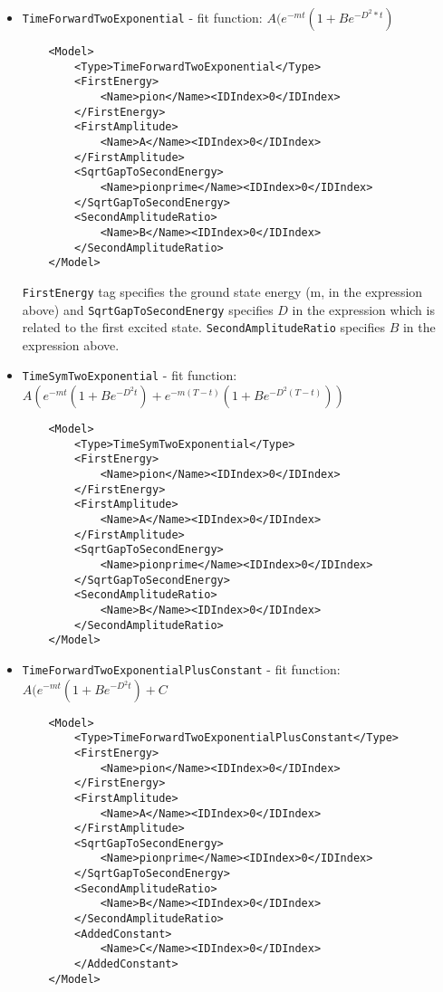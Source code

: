 \documentclass[12pt,notitlepage,letterpaper]{article}
\newcommand{\vb}{\texttt}
\begin{document}
\begin{itemize}
\item \vb{TimeForwardTwoExponential} - fit function: $A(e^{-mt}(1 + B e^{-D^2*t})$ 
\begin{verbatim}
    <Model>
        <Type>TimeForwardTwoExponential</Type>
        <FirstEnergy>
            <Name>pion</Name><IDIndex>0</IDIndex>
        </FirstEnergy>
        <FirstAmplitude>
            <Name>A</Name><IDIndex>0</IDIndex>
        </FirstAmplitude>
        <SqrtGapToSecondEnergy>
            <Name>pionprime</Name><IDIndex>0</IDIndex>
        </SqrtGapToSecondEnergy>
        <SecondAmplitudeRatio>
            <Name>B</Name><IDIndex>0</IDIndex>
        </SecondAmplitudeRatio>
    </Model>
\end{verbatim}

\vb{FirstEnergy} tag specifies the ground state energy (m, in the expression above) and \vb{SqrtGapToSecondEnergy} specifies $D$ in the expression which is  related to the first excited state.
\vb{SecondAmplitudeRatio} specifies $B$ in the expression above.

\item \vb{TimeSymTwoExponential} - fit function: $A(e^{-mt}(1 + B e^{-D^2t}) + e^{-m(T-t)}(1 + B e^{-D^2(T-t)}))$
\begin{verbatim}
    <Model>
        <Type>TimeSymTwoExponential</Type>
        <FirstEnergy>
            <Name>pion</Name><IDIndex>0</IDIndex>
        </FirstEnergy>
        <FirstAmplitude>
            <Name>A</Name><IDIndex>0</IDIndex>
        </FirstAmplitude>
        <SqrtGapToSecondEnergy>
            <Name>pionprime</Name><IDIndex>0</IDIndex>
        </SqrtGapToSecondEnergy>
        <SecondAmplitudeRatio>
            <Name>B</Name><IDIndex>0</IDIndex>
        </SecondAmplitudeRatio>
    </Model>
\end{verbatim}

\item \vb{TimeForwardTwoExponentialPlusConstant} - fit function: $A(e^{-mt}(1 + B e^{-D^2t}) + C$
\begin{verbatim}
    <Model>
        <Type>TimeForwardTwoExponentialPlusConstant</Type>
        <FirstEnergy>
            <Name>pion</Name><IDIndex>0</IDIndex>
        </FirstEnergy>
        <FirstAmplitude>
            <Name>A</Name><IDIndex>0</IDIndex>
        </FirstAmplitude>
        <SqrtGapToSecondEnergy>
            <Name>pionprime</Name><IDIndex>0</IDIndex>
        </SqrtGapToSecondEnergy>
        <SecondAmplitudeRatio>
            <Name>B</Name><IDIndex>0</IDIndex>
        </SecondAmplitudeRatio>
        <AddedConstant>
            <Name>C</Name><IDIndex>0</IDIndex>
        </AddedConstant>
    </Model>
\end{verbatim}


\end{itemize}
\end{document}
